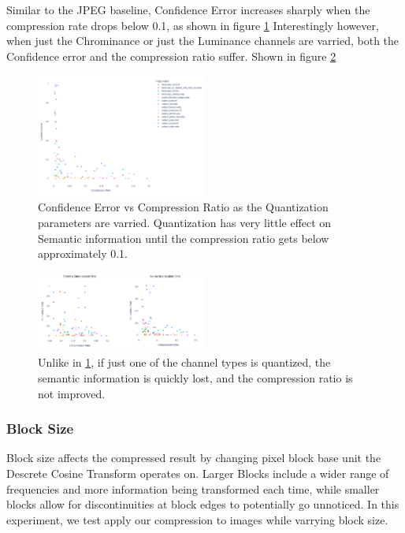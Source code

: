 Similar to the JPEG baseline, Confidence Error increases sharply when the compression rate drops below 0.1, as shown in figure \ref{fig:Confidence vs Quantization}
Interestingly however, when just the Chrominance or just the Luminance channels are varried, both the Confidence error and the compression ratio suffer. Shown in figure \ref{fig:just chroma or luma downsampling}

\begin{figure}
    \label{fig:Confidence vs Quantization}
    \includegraphics[width=0.5\textwidth]{assets/Quantization Sweep No Title Chrominance and Luminance.png}
    \caption{Confidence Error vs Compression Ratio as the Quantization parameters are varried. Quantization has very little effect on Semantic information until the compression ratio gets below approximately 0.1.}
\end{figure}
\begin{figure}
    \label{fig:just chroma or luma downsampling}
    \includegraphics[width=0.5\textwidth]{assets/Chroma and Luma downsampling combined.png}
    \caption{Unlike in \ref{fig:Confidence vs Quantization}, if just one of the channel types is quantized, the semantic information is quickly lost, and the compression ratio is not improved.}
\end{figure}

\subsubsection{Block Size}

Block size affects the compressed result by changing pixel block base unit the Descrete Cosine Transform operates on.
Larger Blocks include a wider range of frequencies and more information being transformed each time, while smaller blocks allow for discontinuities at block edges to potentially go unnoticed.
In this experiment, we test apply our compression to images while varrying block size.

